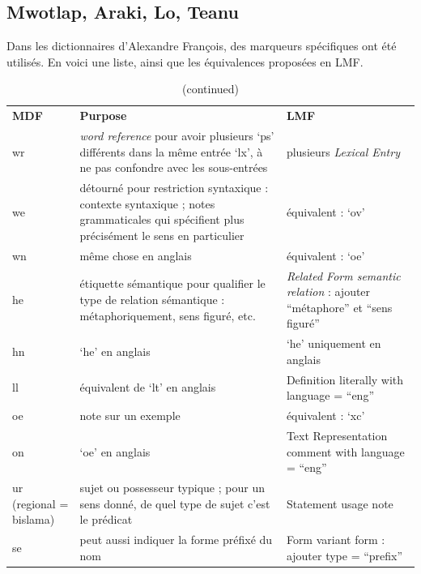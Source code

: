 \documentclass[a4paper,12pt]{article}
\begin{document}
\pagebreak



\pagebreak

\subsection{Mwotlap, Araki, Lo, Teanu}

Dans les dictionnaires d'Alexandre François, des marqueurs spécifiques ont été utilisés. En voici une liste, ainsi que les équivalences proposées en LMF.

\begin{center}
\begin{longtable}{|p{4cm}|p{5cm}|p{6cm}|}
\caption[]{Mowtlap dictionary: matching between MDF and LMF} \\ \hline
\endfirsthead
\caption[]{(continued)} \\
\endhead
\endfoot
\endlastfoot
\textbf{MDF} & \textbf{Purpose} & \textbf{LMF} \\ \hline
wr & \textit{word reference} pour avoir plusieurs ‘ps’ différents dans la même entrée ‘lx’, à ne pas confondre avec les sous-entrées & plusieurs \textit{Lexical Entry} \\ \hline
we & détourné pour restriction syntaxique : contexte syntaxique ; notes grammaticales qui spécifient plus précisément le sens en particulier & équivalent : `ov' \\ \hline
wn & même chose en anglais & équivalent : `oe' \\ \hline
he & étiquette sémantique pour qualifier le type de relation sémantique : métaphoriquement, sens figuré, etc. & \textit{Related Form semantic relation} : ajouter ``métaphore'' et ``sens figuré'' \\ \hline
hn & `he' en anglais & `he' uniquement en anglais \\ \hline
ll & équivalent de `lt' en anglais & Definition literally with language = “eng” \\ \hline
oe & note sur un exemple & équivalent : `xc' \\ \hline
on & `oe' en anglais & Text Representation comment with language = “eng” \\ \hline
ur (regional = bislama) & sujet ou possesseur typique ; pour un sens donné, de quel type de sujet c’est le prédicat & Statement usage note \\ \hline
se & peut aussi indiquer la forme préfixé du nom & Form variant form : ajouter type = “prefix” \\ \hline

\end{longtable}
\end{center}
\end{document}
